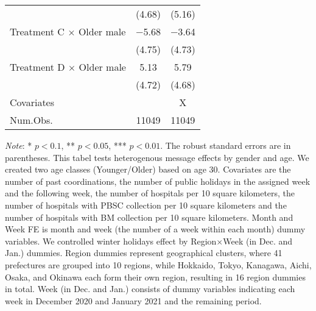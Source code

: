 \documentclass[12pt, a4paper]{article}
\begin{document}
\begin{table}[H]
\begin{threeparttable}
\begin{tabular}[t]{lcc}
 & (\num{4.68}) & (\num{5.16})\\
Treatment C $\times$ Older male & \num{-5.68} & \num{-3.64}\\
 & (\num{4.75}) & (\num{4.73})\\
Treatment D $\times$ Older male & \num{5.13} & \num{5.79}\\
 & (\num{4.72}) & (\num{4.68})\\
\midrule
Covariates &  & X\\
Num.Obs. & \num{11049} & \num{11049}\\
\bottomrule
\end{tabular}
\begin{tablenotes}
\item \emph{Note}: * $p < 0.1$, ** $p < 0.05$, *** $p < 0.01$. The robust standard errors are in parentheses. This tabel tests heterogenous message effects by gender and age. We created two age classes (Younger/Older) based on age 30. Covariates are the number of past coordinations, the number of public holidays in the assigned week and the following week, the number of hospitals per 10 square kilometers, the number of hospitals with PBSC collection per 10 square kilometers and the number of hospitals with BM collection per 10 square kilometers. Month and Week FE is month and week (the number of a week within each month) dummy variables. We controlled winter holidays effect by Region$\times$Week (in Dec. and Jan.) dummies. Region dummies represent geographical clusters, where 41 prefectures are grouped into 10 regions, while Hokkaido, Tokyo, Kanagawa, Aichi, Osaka, and Okinawa each form their own region, resulting in 16 region dummies in total. Week (in Dec. and Jan.) consists of dummy variables indicating each week in December 2020 and January 2021 and the remaining period.
\end{tablenotes}
\end{threeparttable}
\end{table}
\end{document}
